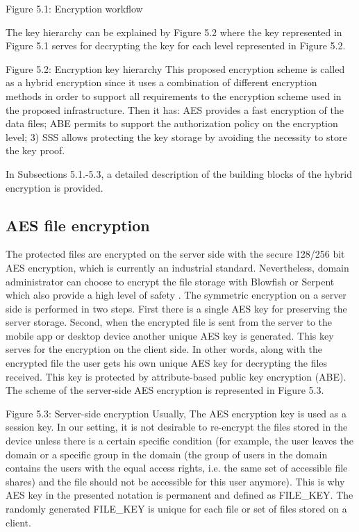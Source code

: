 \documentclass[twocolumn]{svjour3}          %
\begin{document}
Figure 5.1: Encryption workflow

The key hierarchy can be explained by Figure 5.2 where the key represented in Figure 5.1 serves for decrypting the key for each level represented in Figure 5.2.

Figure 5.2: Encryption key hierarchy
This proposed encryption scheme is called as a hybrid encryption since it uses a combination of different encryption methods in order to support all requirements to the encryption scheme used in the proposed infrastructure. Then it has:
AES provides a fast encryption of the data files;
ABE permits to support the authorization policy on the encryption level;
3)  SSS allows protecting the key storage by avoiding the necessity to store the key proof.

In Subsections 5.1.-5.3, a detailed description of the building blocks of the hybrid encryption is provided.

\subsection{AES file encryption }
\label{sec_aes}
The protected files are encrypted on the server side with the secure 128/256 bit AES encryption, which is currently an industrial standard. Nevertheless, domain administrator can choose to encrypt the file storage with Blowfish or Serpent which also provide a high level of safety \cite{nist2000}. The symmetric encryption on a server side is performed in two steps. First there is a single AES key for preserving the server storage. Second, when the encrypted file is sent from the server to the mobile app or desktop device another unique AES key is generated. This key serves for the encryption on the client side. In other words, along with the encrypted file the user gets his own unique AES key for decrypting the files received. This key is protected by attribute-based public key encryption (ABE). The scheme of the server-side AES encryption is represented in Figure 5.3.

Figure 5.3: Server-side encryption
Usually, The AES encryption key is used as a session key. In our setting, it is not desirable to re-encrypt the files stored in the device unless there is a certain specific condition (for example, the user leaves the domain or a specific group in the domain (the group of users in the domain contains the users with the equal access rights, i.e. the same set of accessible file shares) and the file should not be accessible for this user anymore). This is why AES key in the presented notation is permanent and defined as FILE\_KEY. The randomly generated FILE\_KEY is unique for each file or set of files stored on a client. 
\end{document}
